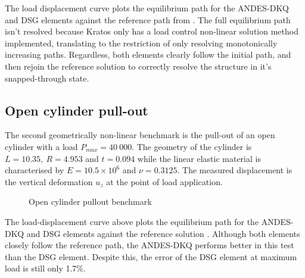  
The load displacement curve plots the equilibrium path for the ANDES-DKQ and DSG elements against the reference path from \cite{Sze2004}. The full equilibrium path isn't resolved because Kratos only has a load control non-linear solution method implemented, translating to the restriction of only resolving monotonically increasing paths. Regardless, both elements clearly follow the initial path, and then rejoin the reference solution to correctly resolve the structure in it's snapped-through state.

\newpage
\subsection{Open cylinder pull-out}

The second geometrically non-linear benchmark is the pull-out of an open cylinder with a load $P_{max} = 40\ 000$. The geometry of the cylinder is $L= 10.35,\ R = 4.953$ and $t = 0.094$ while the linear elastic material is characterised by $E = 10.5\times10^6$ and $\nu = 0.3125$. The measured displacement is the vertical deformation $u_z$ at the point of load application.

 
\begin{figure}[H]
	\caption{\label{ref_label_overall}Open cylinder pullout benchmark}
\end{figure}

 The load-displacement curve above plots the equilibrium path for the ANDES-DKQ and DSG elements against the reference solution \cite{Sze2004}. Although both elements closely follow the reference path, the ANDES-DKQ performs better in this test than the DSG element. Despite this, the error of the DSG element at maximum load is still only 1.7\%.

